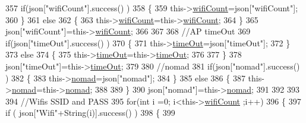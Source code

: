 \begin{DoxyCode}
357             \textcolor{keywordflow}{if}(json[\textcolor{stringliteral}{"wifiCount"}].success() )
358             \{           
359                 this->\hyperlink{class_cool_wifi_ab133bd92fcb895b884deecd6678592e4}{wifiCount}=json[\textcolor{stringliteral}{"wifiCount"}];
360             \}
361             \textcolor{keywordflow}{else}
362             \{
363                 this->\hyperlink{class_cool_wifi_ab133bd92fcb895b884deecd6678592e4}{wifiCount}=this->\hyperlink{class_cool_wifi_ab133bd92fcb895b884deecd6678592e4}{wifiCount};
364             \}
365             json[\textcolor{stringliteral}{"wifiCount"}]=this->\hyperlink{class_cool_wifi_ab133bd92fcb895b884deecd6678592e4}{wifiCount};
366 
367             
368             \textcolor{comment}{//AP timeOut}
369             \textcolor{keywordflow}{if}(json[\textcolor{stringliteral}{"timeOut"}].success() )
370             \{
371                 this->\hyperlink{class_cool_wifi_a952111605f25156588b5632caaba1c6f}{timeOut}=json[\textcolor{stringliteral}{"timeOut"}];
372             \}
373             \textcolor{keywordflow}{else}
374             \{
375                 this->\hyperlink{class_cool_wifi_a952111605f25156588b5632caaba1c6f}{timeOut}=this->\hyperlink{class_cool_wifi_a952111605f25156588b5632caaba1c6f}{timeOut};
376 
377             \}
378             json[\textcolor{stringliteral}{"timeOut"}]=this->\hyperlink{class_cool_wifi_a952111605f25156588b5632caaba1c6f}{timeOut};
379 
380             \textcolor{comment}{//nomad}
381             \textcolor{keywordflow}{if}(json[\textcolor{stringliteral}{"nomad"}].success() )
382             \{
383                 this->\hyperlink{class_cool_wifi_ab7d9643c4af7bac3be331ef008b2ea27}{nomad}=json[\textcolor{stringliteral}{"nomad"}];
384             \}
385             \textcolor{keywordflow}{else}
386             \{
387                 this->\hyperlink{class_cool_wifi_ab7d9643c4af7bac3be331ef008b2ea27}{nomad}=this->\hyperlink{class_cool_wifi_ab7d9643c4af7bac3be331ef008b2ea27}{nomad};
388 
389             \}
390             json[\textcolor{stringliteral}{"nomad"}]=this->\hyperlink{class_cool_wifi_ab7d9643c4af7bac3be331ef008b2ea27}{nomad};
391 
392             
393             
394             \textcolor{comment}{//Wifis SSID and PASS}
395             \textcolor{keywordflow}{for}(\textcolor{keywordtype}{int} i =0; i<this->\hyperlink{class_cool_wifi_ab133bd92fcb895b884deecd6678592e4}{wifiCount} ;i++)
396             \{
397                 \textcolor{keywordflow}{if} ( json[\textcolor{stringliteral}{"Wifi"}+String(i)].success() )
398                 \{
399                     

\end{DoxyCode}

